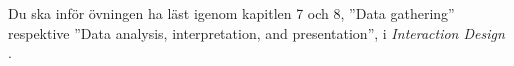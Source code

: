 Du ska inför övningen ha läst igenom kapitlen 7 och 8, 
''\foreignlanguage{english}{Data gathering}'' respektive 
''\foreignlanguage{english}{Data analysis, interpretation, and presentation}'', 
i \emph{Interaction Design} \citep{Sharp2011idb}.

